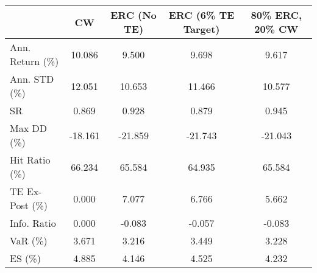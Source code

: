 \begin{tabular}{lcccc}
\toprule
{} &      CW &  ERC (No TE) &   ERC (6\% TE Target) &  80\% ERC, 20\% CW \\
\midrule
Ann. Return (\%) &  10.086 &        9.500 &                9.698 &            9.617 \\
Ann. STD (\%)    &  12.051 &       10.653 &               11.466 &           10.577 \\
SR              &   0.869 &        0.928 &                0.879 &            0.945 \\
Max DD (\%)      & -18.161 &      -21.859 &              -21.743 &          -21.043 \\
Hit Ratio (\%)   &  66.234 &       65.584 &               64.935 &           65.584 \\
TE Ex-Post (\%)  &   0.000 &        7.077 &                6.766 &            5.662 \\
Info. Ratio     &   0.000 &       -0.083 &               -0.057 &           -0.083 \\
VaR (\%)         &   3.671 &        3.216 &                3.449 &            3.228 \\
ES (\%)          &   4.885 &        4.146 &                4.525 &            4.232 \\
\bottomrule
\end{tabular}
